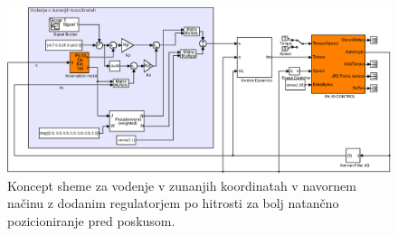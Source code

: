 \begin{figure}
	\centering
	\includegraphics[trim={0 0cm 0 0cm},scale=0.5]{./Slike/zunanje_koordinate_tq.eps}
	\caption{Koncept \simulink sheme za vodenje v zunanjih koordinatah v navornem na\v{c}inu z dodanim regulatorjem po hitrosti za bolj natan\v{c}no pozicioniranje pred poskusom.}
	\label{fig:zunanje_koordinate_tq}
\end{figure}
